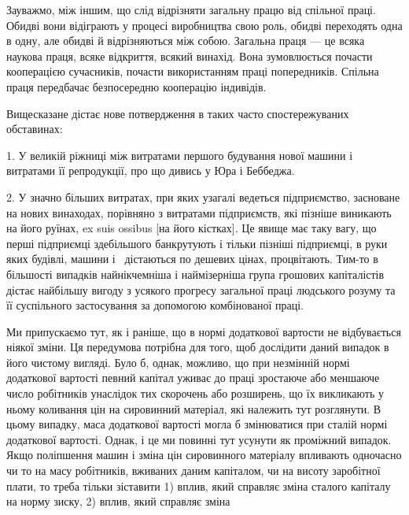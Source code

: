 Зауважмо, між іншим, що слід відрізняти загальну працю від
спільної праці. Обидві вони відіграють у процесі виробництва
свою роль, обидві переходять одна в одну, але обидві й
відрізняються між собою. Загальна праця — це всяка наукова
праця, всяке відкриття, всякий винахід. Вона зумовлюється почасти кооперацією сучасників, почасти
використанням праці попередників. Спільна праця передбачає безпосередню кооперацію індивідів.

Вищесказане дістає нове потвердження в таких часто спостережуваних обставинах:

1. У великій ріжниці між витратами першого будування нової
машини і витратами її репродукції, про що дивись у Юра
і Беббеджа.

2. У значно більших витратах, при яких узагалі ведеться підприємство, засноване на нових винаходах,
порівняно з витратами
підприємств, які пізніше виникають на його руїнах, ex suis ossibus
[на його кістках]. Це явище має таку вагу, що перші
підприємці здебільшого банкрутують і тільки пізніші підприємці,
в руки яких будівлі, машини і~ дістаються по дешевих цінах, процвітають. Тим-то в більшості
випадків найнікчемніша
і наймізерніша група грошових капіталістів дістає найбільшу
вигоду з усякого прогресу загальної праці людського розуму та
її суспільного застосування за допомогою комбінованої праці.


Ми припускаємо тут, як і раніше, що в нормі додаткової
вартости не відбувається ніякої зміни. Ця передумова потрібна
для того, щоб дослідити даний випадок в його чистому вигляді.
Було б, однак, можливо, що при незмінній нормі додаткової вартості певний капітал уживає до праці
зростаюче або меншаюче число робітників унаслідок тих скорочень або розширень, що їх викликають у
ньому коливання цін на сировинний матеріал, які належить тут розглянути. В цьому випадку,
маса додаткової вартості могла б змінюватися при сталій нормі
додаткової вартості. Однак, і це ми повинні тут усунути
як проміжний випадок. Якщо поліпшення машин і зміна цін
сировинного матеріалу впливають одночасно чи то на масу
робітників, вживаних даним капіталом, чи на висоту заробітної
плати, то треба тільки зіставити 1) вплив, який справляє зміна
сталого капіталу на норму зиску, 2) вплив, який справляє зміна
\parbreak{}  %
